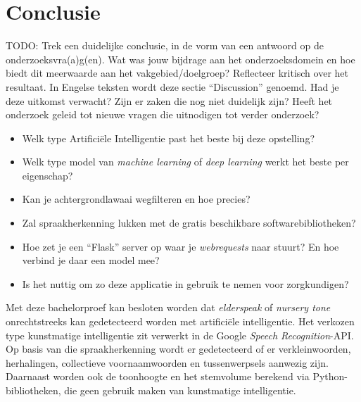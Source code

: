 
\chapter{Conclusie}
\label{ch:conclusie}



\color{blue}
TODO: Trek een duidelijke conclusie, in de vorm van een antwoord op de
 onderzoeksvra(a)g(en). Wat was jouw bijdrage aan het onderzoeksdomein en
 hoe biedt dit meerwaarde aan het vakgebied/doelgroep?
 Reflecteer kritisch over het resultaat. In Engelse teksten wordt deze sectie
 ``Discussion'' genoemd. Had je deze uitkomst verwacht? Zijn er zaken die nog
 niet duidelijk zijn?
 Heeft het onderzoek geleid tot nieuwe vragen die uitnodigen tot verder
onderzoek?


\begin{itemize}
    \item Welk type Artificiële Intelligentie past het beste bij deze opstelling?
    \item Welk type model van \textit{machine learning} of \textit{deep learning} werkt het beste per eigenschap?
    \item Kan je achtergrondlawaai wegfilteren en hoe precies?
    \item Zal spraakherkenning lukken met de gratis beschikbare softwarebibliotheken?
    \item Hoe zet je een ``Flask'' server op waar je \textit{webrequests} naar stuurt? En hoe verbind je daar een model mee?
    \item Is het nuttig om zo deze applicatie in gebruik te nemen voor zorgkundigen?
\end{itemize}

\color{black}

Met deze bachelorproef kan besloten worden dat \textit{elderspeak} of \textit{nursery tone} onrechtstreeks kan gedetecteerd worden met artificiële intelligentie. Het verkozen type kunstmatige intelligentie zit verwerkt in de Google \textit{Speech Recognition}-API. Op basis van die spraakherkenning wordt er gedetecteerd of er verkleinwoorden, herhalingen, collectieve voornaamwoorden en tussenwerpsels aanwezig zijn. Daarnaast worden ook de toonhoogte en het stemvolume berekend via Python-bibliotheken, die geen gebruik maken van kunstmatige intelligentie.

